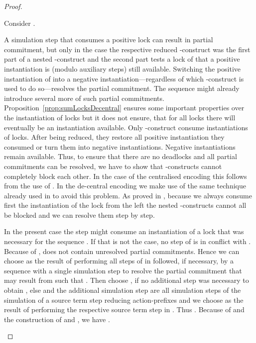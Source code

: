 \documentclass[]{eptcs}
\begin{document}
\begin{proof}
\begin{compactitem}
			Consider .
			\begin{compactenum}
				\item A simulation step  that consumes a positive lock can result in partial commitment, but only in the case the respective reduced -construct was the first part of a nested -construct and the second part tests a lock  of that a positive instantiation is (modulo auxiliary steps) still available. Switching the positive instantiation of  into a negative instantiation---regardless of which -construct is used to do so---resolves the partial commitment. The sequence  might already introduce several more of such partial commitments. Proposition~\ref{prop:sumLocksDecentral} ensures some important properties over the instantiation of locks but it does not ensure, that for all locks there will eventually be an instantiation available. Only -construct consume instantiations of locks. After being reduced, they restore all positive instantiation they consumed or turn them into negative instantiations. Negative instantiations remain available. Thus, to ensure that there are no deadlocks and all partial commitments can be resolved, we have to show that -constructs cannot completely block each other. In the case of the centralised encoding this follows from the use of . In the de-central encoding we make use of the same technique already used in \cite{peters12, petersNestmann15} to avoid this problem. As proved in \cite{peters12}, because we always consume first the instantiation of the lock from the left the nested -constructs cannot all be blocked and we can resolve them step by step.
					
					In the present case the step  might consume an instantiation of a lock that was necessary for the sequence . If that is not the case, no step of  is in conflict with . Because of ,  does not contain unresolved partial commitments. Hence we can choose  as the result of performing all steps of  in  followed, if necessary, by a sequence with a single simulation step  to resolve the partial commitment that may result from  such that . Then choose , if no additional step was necessary to obtain , else  and the additional simulation step are all simulation steps of the simulation of a source term step reducing action-prefixes and we choose  as the result of performing the respective source term step in . Thus . Because of  and the construction of  and , we have .
					

\end{compactenum}
\end{compactitem}
\end{proof}
\end{document}
